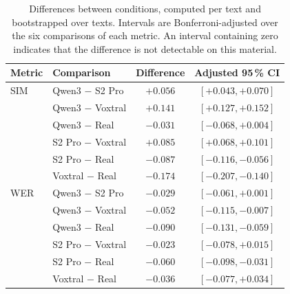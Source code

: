 \begin{table}[H]
    \centering
    \small
    \begin{tabular}{llcc}
        \toprule
        \textbf{Metric} & \textbf{Comparison} & \textbf{Difference} & \textbf{Adjusted 95\,\% CI} \\
        \midrule
        SIM & Qwen3 $-$ S2 Pro & $+0.056$ & $[+0.043, +0.070]$ \\
         & Qwen3 $-$ Voxtral & $+0.141$ & $[+0.127, +0.152]$ \\
         & Qwen3 $-$ Real & $-0.031$ & $[-0.068, +0.004]$ \\
         & S2 Pro $-$ Voxtral & $+0.085$ & $[+0.068, +0.101]$ \\
         & S2 Pro $-$ Real & $-0.087$ & $[-0.116, -0.056]$ \\
         & Voxtral $-$ Real & $-0.174$ & $[-0.207, -0.140]$ \\
        \midrule
        WER & Qwen3 $-$ S2 Pro & $-0.029$ & $[-0.061, +0.001]$ \\
         & Qwen3 $-$ Voxtral & $-0.052$ & $[-0.115, -0.007]$ \\
         & Qwen3 $-$ Real & $-0.090$ & $[-0.131, -0.059]$ \\
         & S2 Pro $-$ Voxtral & $-0.023$ & $[-0.078, +0.015]$ \\
         & S2 Pro $-$ Real & $-0.060$ & $[-0.098, -0.031]$ \\
         & Voxtral $-$ Real & $-0.036$ & $[-0.077, +0.034]$ \\
        \bottomrule
    \end{tabular}
    \caption{Differences between conditions, computed per text and bootstrapped over texts. Intervals are Bonferroni-adjusted over the six comparisons of each metric. An interval containing zero indicates that the difference is not detectable on this material.}
    \label{tab:objective_pairwise}
\end{table}
